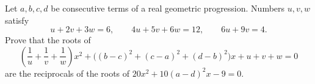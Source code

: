 Let $a,b,c,d$ be consecutive terms of a real geometric progression. Numbers $u,v,w$ satisfy
\[
u+2v+3w=6,\qquad4u+5v+6w=12,\qquad6u+9v=4.
\]
Prove that the roots of
\[
\left(\dfrac{1}{u}+\dfrac{1}{v}+\dfrac{1}{w}\right)x^2+
\bigl((b-c)^2+(c-a)^2+(d-b)^2\bigr)x+u+v+w=0
\]
are the reciprocals of the roots of $20x^2+10(a-d)^2x-9=0$.
